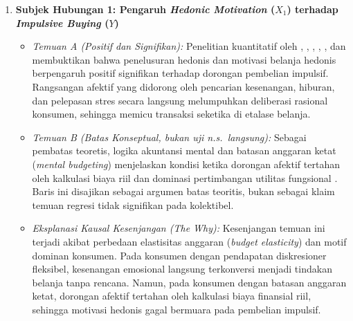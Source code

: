 \documentclass[12pt,a4paper]{article}
\numberwithin{equation}{section}
\numberwithin{table}{section}
\numberwithin{figure}{section}
\begin{document}
\begin{enumerate}
  \item \textbf{Subjek Hubungan 1: Pengaruh \emph{Hedonic Motivation} ($X_1$) terhadap \emph{Impulsive Buying} ($Y$)}
  \begin{itemize}
    \item \emph{Temuan A (Positif dan Signifikan):} Penelitian kuantitatif oleh \citet{arnold2003hedonic}, \citet{gueltekin2012influence}, \citet{pranggabayu2022pengaruh}, \citet{gong2024unveiling}, \citet{tirtayasa2020effect}, dan \citet{zheng2019impact} membuktikan bahwa penelusuran hedonis dan motivasi belanja hedonis berpengaruh positif signifikan terhadap dorongan pembelian impulsif. Rangsangan afektif yang didorong oleh pencarian kesenangan, hiburan, dan pelepasan stres secara langsung melumpuhkan deliberasi rasional konsumen, sehingga memicu transaksi seketika di etalase belanja.
    \item \emph{Temuan B (Batas Konseptual, bukan uji n.s.\ langsung):} Sebagai pembatas teoretis, logika akuntansi mental dan batasan anggaran ketat (\emph{mental budgeting}) menjelaskan kondisi ketika dorongan afektif tertahan oleh kalkulasi biaya riil dan dominasi pertimbangan utilitas fungsional \citep{thaler1985mental, thaler1981economic}. Baris ini disajikan sebagai argumen batas teoritis, bukan sebagai klaim temuan regresi tidak signifikan pada kolektibel.
    \item \emph{Eksplanasi Kausal Kesenjangan (\emph{The Why}):} Kesenjangan temuan ini terjadi akibat perbedaan elastisitas anggaran (\emph{budget elasticity}) dan motif dominan konsumen. Pada konsumen dengan pendapatan diskresioner fleksibel, kesenangan emosional langsung terkonversi menjadi tindakan belanja tanpa rencana. Namun, pada konsumen dengan batasan anggaran ketat, dorongan afektif tertahan oleh kalkulasi biaya finansial riil, sehingga motivasi hedonis gagal bermuara pada pembelian impulsif.
  \end{itemize}


\end{enumerate}
\end{document}
